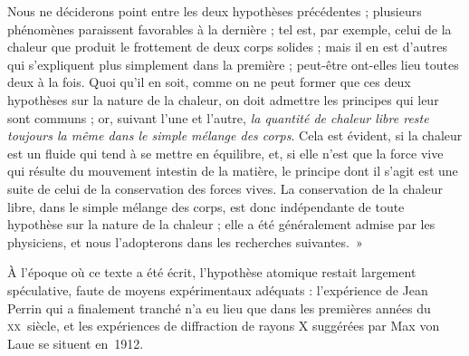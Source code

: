 	Nous ne déciderons point entre les deux hypothèses précédentes ; plusieurs phénomènes paraissent favorables à la dernière ; tel est, par exemple, celui de la chaleur que produit le frottement de deux corps solides ; mais il en est d’autres qui s’expliquent plus simplement dans la première ; peut-être ont-elles lieu toutes deux à la fois. Quoi qu’il en soit, comme on ne peut former que ces deux hypothèses sur la nature de la chaleur, on doit admettre les principes qui leur sont communs ; or, suivant l’une et l’autre, \emph{la quantité de chaleur libre reste toujours la même dans le simple mélange des corps}. Cela est évident, si la chaleur est un fluide qui tend à se mettre en équilibre, et, si elle n’est que la force vive qui résulte du mouvement intestin de la matière, le principe dont il s’agit est une suite de celui de la conservation des forces vives. La conservation de la chaleur libre, dans le simple mélange des corps, est donc indépendante de toute hypothèse sur la nature de la chaleur ; elle a été généralement admise par les physiciens, et nous l’adopterons dans les recherches suivantes.~» \onlyframabook{\end{quote}}\onlyamphibook{\end{historyquote}}

	À l'époque où ce texte a été écrit, l'hypothèse atomique restait largement spéculative, faute de moyens expérimentaux adéquats : l'expérience de Jean Perrin qui a finalement tranché n'a eu lieu que dans les premières années du \textsc{xx}\ieme\ siècle, et les expériences de diffraction de rayons X suggérées par Max von Laue se situent en~1912.

\atendofhistorysection
